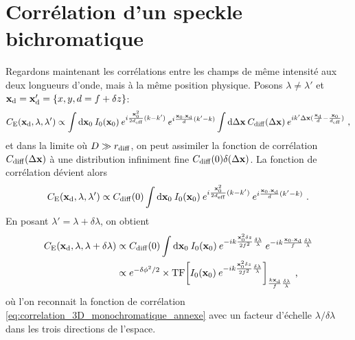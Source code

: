 \section{Corrélation d'un speckle bichromatique}
Regardons maintenant les corrélations entre les champs de même intensité aux deux longueurs d'onde, mais à la même position physique. Posons $\lambda\neq\lambda'$ et $\mathbf{x}_{\mathrm{d}}=\mathbf{x}_{\mathrm{d}}'=\lbrace x,y,d=f+\delta z \rbrace$:
\begin{equation}
C_{\mathrm{E}}(\mathbf{x}_{\mathrm{d}},\lambda,\lambda') \propto \int{\mathop{}\mathopen{}\mathrm{d}\mathbf{x}_0\: I_0(\mathbf{x}_0) \: e^{i\frac{\mathbf{x}_0^2}{2d_{\mathrm{eff}}}(k-k')} \: e^{i\frac{\mathbf{x}_0.\mathbf{x}_{\mathrm{d}}}{d}(k'-k)} \int{\mathop{}\mathopen{}\mathrm{d}\Delta\mathbf{x}\: C_{\mathrm{diff}}(\Delta\mathbf{x}) \: e^{i k' \Delta\mathbf{x}(\frac{\mathbf{x}_{\mathrm{d}}}{d}-\frac{\mathbf{x}_0}{d_{\mathrm{eff}}})}}} \text{ ,}
\end{equation}
et dans la limite où $D\gg r_{\mathrm{diff}}$, on peut assimiler la fonction de corrélation $C_{\mathrm{diff}}(\Delta\mathbf{x})$  à une distribution infiniment fine $C_{\mathrm{diff}}(0) \delta(\Delta\mathbf{x})$. La fonction de corrélation dévient alors
\begin{equation}
C_{\mathrm{E}}(\mathbf{x}_{\mathrm{d}},\lambda,\lambda') \propto  C_{\mathrm{diff}}(0) \int{\mathop{}\mathopen{}\mathrm{d}\mathbf{x}_0\: I_0(\mathbf{x}_0) \: e^{i\frac{\mathbf{x}_0^2}{2d_{\mathrm{eff}}}(k-k')} \: e^{i\frac{\mathbf{x}_0.\mathbf{x}_{\mathrm{d}}}{d}(k'-k)}} \text{ .}
\end{equation}
En posant $\lambda'=\lambda+ \delta \lambda$, on obtient
\begin{align}
C_{\mathrm{E}}(\mathbf{x}_{\mathrm{d}},\lambda, \lambda+\delta\lambda) &\propto C_{\mathrm{diff}}(0) \int{\mathop{}\mathopen{}\mathrm{d}\mathbf{x}_0\: I_0(\mathbf{x}_0) \: e^{-ik \frac{\mathbf{x}_0^2 \delta z}{2f^2} \frac{\delta \lambda}{\lambda}} \: e^{-ik \frac{\mathbf{x}_0.\mathbf{x}_{\mathrm{d}}}{f}\frac{\delta \lambda}{\lambda}}} \\
& \propto e^{-\delta\phi^2/2} \times \mathrm{TF}{\left[ I_0(\mathbf{x}_0)\: e^{-ik\frac{\mathbf{x}_0^2 \delta z}{2f^2} \frac{\delta\lambda}{\lambda}} \right]}_{\frac{k \mathbf{x}_{\mathrm{d}}}{f}\frac{\delta \lambda}{\lambda}} \text{ ,}
\end{align}
où l'on reconnait la fonction de corrélation \ref{eq:correlation_3D_monochromatique_annexe} avec un facteur d'échelle $\lambda/\delta\lambda$ dans les trois directions de l'espace.







